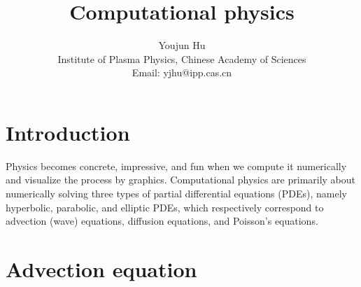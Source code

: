 \documentclass{article}
\newcommand{\tmaffiliation}[1]{\\ #1}
\begin{document}
\title{Computational physics}

\author{
  Youjun Hu
  \tmaffiliation{Institute of Plasma Physics, Chinese Academy of Sciences}
  \tmaffiliation{Email: yjhu@ipp.cas.cn}
}

\maketitle

\section{Introduction}

Physics becomes concrete, impressive, and fun when we compute it numerically
and visualize the process by graphics. Computational physics are primarily
about numerically solving three types of partial differential equations
(PDEs), namely hyperbolic, parabolic, and elliptic PDEs, which respectively
correspond to advection (wave) equations, diffusion equations, and Poisson's
equations.

\section{Advection equation}
\end{document}
